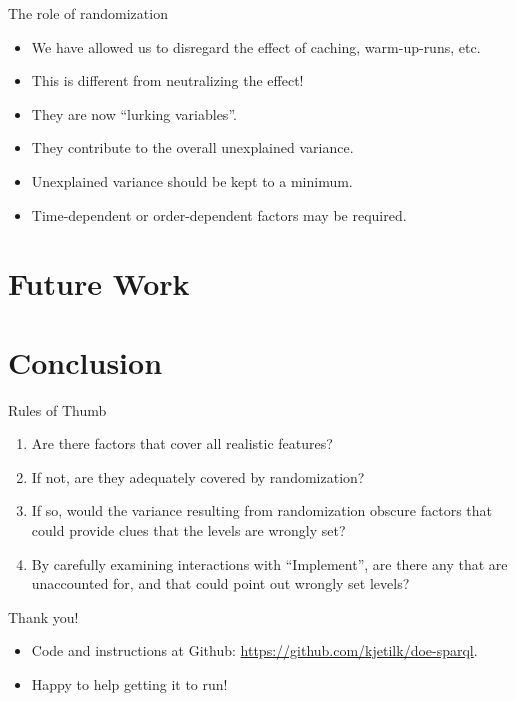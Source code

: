 \documentclass[english,handout,aspectratio=169]{ifislide}
\begin{document}
\begin{frame}{The role of randomization}
  \begin{itemize}
  \item We have allowed us to disregard the effect of caching,
    warm-up-runs, etc.
  \item This is different from neutralizing the effect!
  \item They are now ``lurking variables''.
  \item They contribute to the overall unexplained variance.
  \item Unexplained variance should be kept to a minimum.
  \item Time-dependent or order-dependent factors may be required.
  \end{itemize}
\end{frame}

\section{Future Work}

\section{Conclusion}

\begin{frame}{Rules of Thumb}

\begin{enumerate}
\item Are there factors that cover all realistic features?
\item If not, are they adequately covered by randomization?
\item If so, would the variance resulting from randomization obscure
  factors that could provide clues that the levels are wrongly set?
\item By carefully examining interactions with ``Implement'', are
  there any that are unaccounted for, and that could point out wrongly
  set levels?
\end{enumerate}

  
\end{frame}


\begin{frame}{Thank you!}

  \begin{itemize}
  \item Code and instructions at Github:
    \url{https://github.com/kjetilk/doe-sparql}.
  \item Happy to help getting it to run!
  \end{itemize}

\end{frame}
\end{document}
